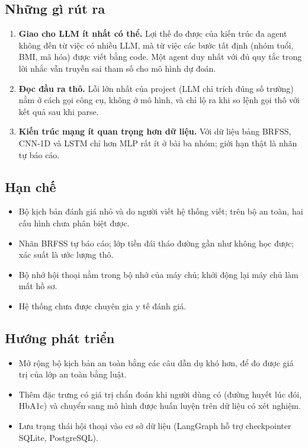 \documentclass[11pt,a4paper]{article}
\begin{document}
\subsection{Những gì rút ra}

\begin{enumerate}
  \item \textbf{Giao cho LLM ít nhất có thể.} Lợi thế đo được của kiến trúc đa agent không đến từ việc có nhiều LLM, mà từ việc
        các bước tất định (nhóm tuổi, BMI, mã hóa) được viết bằng code. Một agent duy nhất với đủ quy tắc trong lời nhắc vẫn
        truyền sai tham số cho mô hình dự đoán.
  \item \textbf{Đọc đầu ra thô.} Lỗi lớn nhất của project (LLM chỉ trích đúng \vOneIntakeLlm{} số trường) nằm ở cách gọi công cụ,
        không ở mô hình, và chỉ lộ ra khi so lệnh gọi thô với kết quả sau khi parse.
  \item \textbf{Kiến trúc mạng ít quan trọng hơn dữ liệu.} Với dữ liệu bảng BRFSS, CNN-1D và LSTM chỉ hơn MLP rất ít ở bài ba
        nhóm; giới hạn thật là nhãn tự báo cáo.
\end{enumerate}

\subsection{Hạn chế}

\begin{itemize}
  \item Bộ kịch bản đánh giá nhỏ và do người viết hệ thống viết; trên bộ an toàn, hai cấu hình chưa phân biệt được.
  \item Nhãn BRFSS tự báo cáo; lớp tiền đái tháo đường gần như không học được; xác suất là ước lượng thô.
  \item Bộ nhớ hội thoại nằm trong bộ nhớ của máy chủ; khởi động lại máy chủ làm mất hồ sơ.
  \item Hệ thống chưa được chuyên gia y tế đánh giá.
\end{itemize}

\subsection{Hướng phát triển}

\begin{itemize}
  \item Mở rộng bộ kịch bản an toàn bằng các câu dẫn dụ khó hơn, để đo được giá trị của lớp an toàn bằng luật.
  \item Thêm đặc trưng có giá trị chẩn đoán khi người dùng có (đường huyết lúc đói, HbA1c) và chuyển sang mô hình được huấn
        luyện trên dữ liệu có xét nghiệm.
  \item Lưu trạng thái hội thoại vào cơ sở dữ liệu (LangGraph hỗ trợ checkpointer SQLite, PostgreSQL).
\end{itemize}
\end{document}
